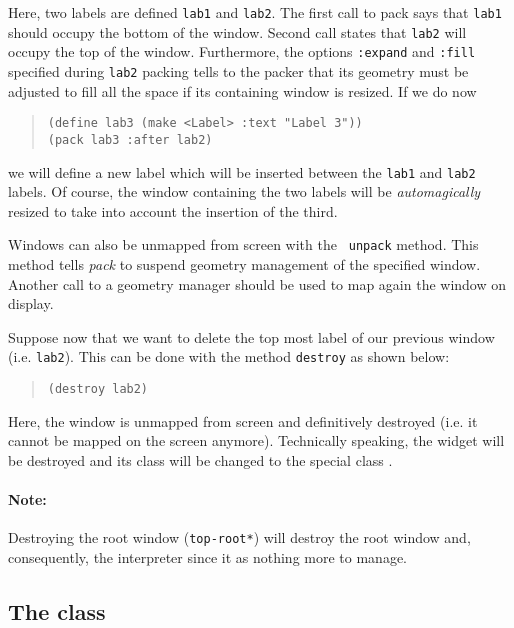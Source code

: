 Here, two labels are defined {\tt lab1} and {\tt lab2}. The first call to
pack says that {\tt lab1} should occupy the bottom of the window. Second
call states that {\tt lab2} will occupy the top of the window. Furthermore,
the  options {\tt :expand} and {\tt :fill} specified during {\tt lab2}
packing tells to the packer that its geometry must be adjusted to fill all
the space if its containing window is resized. If we do now 
\begin{quote}
\begin{verbatim}
(define lab3 (make <Label> :text "Label 3"))
(pack lab3 :after lab2)
\end{verbatim}
\end{quote}
we will define a new label which will be inserted between the {\tt lab1} and
{\tt lab2} labels.  Of course, the window containing the two labels  will
be {\em automagically} resized to take into account the insertion of the third.

Windows can also be unmapped from screen with the {\tt
unpack} method. This method tells {\em pack} to suspend
geometry management of the specified window. Another call to a geometry
manager should be used to map again the window on display.

Suppose now that we want to delete the top most label of our previous
window (i.e. {\tt lab2}). 
This can be done with the {\tt <Tk-widget>} method {\tt destroy} as
shown below: 
\begin{quote}
\begin{verbatim}
(destroy lab2)
\end{verbatim}
\end{quote}
\noindent
Here, the window is unmapped from screen and definitively destroyed
(i.e. it cannot be mapped on the screen anymore). Technically speaking, the
widget will be destroyed and its class will be changed to the special class
{\tt <Destroyed-object>}.

\paragraph{\bf Note:} Destroying the root window 
({\tt *top-root*}) will destroy the root window
and, consequently, the interpreter since it as nothing more to manage.

\subsection{The {\tt <Tk-simple-widget>} class}


